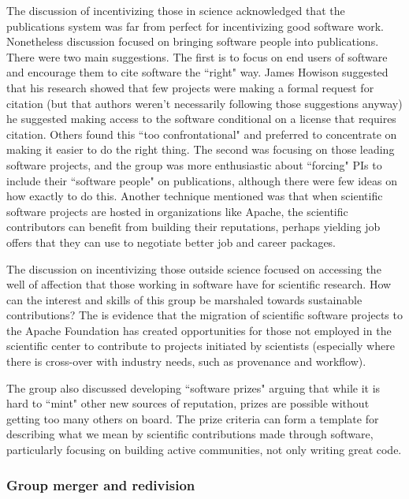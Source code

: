 \documentclass[11pt, oneside]{amsart}
\begin{document}
The discussion of incentivizing those in science acknowledged that the publications system was far from perfect for incentivizing good software work.
Nonetheless discussion focused on bringing software people into publications. There were two main suggestions.
The first is to focus on end users of software and encourage them to cite software the ``right" way.
James Howison suggested that his research showed that few projects were making a formal request for citation (but that authors weren't necessarily following those suggestions anyway) \cite{howison2015jasist} he suggested making access to the software conditional on a license that requires citation.
Others found this ``too confrontational" and preferred to concentrate on making it easier to do the right thing.
The second was focusing on those leading software projects, and the group was more enthusiastic about ``forcing" PIs to include their ``software people" on publications, although there were few ideas on how exactly to do this.
Another technique mentioned was that when scientific software projects are hosted in organizations like Apache, the scientific contributors can benefit from building their reputations, perhaps yielding job offers that they can use to negotiate better job and career packages.

The discussion on incentivizing those outside science focused on accessing the well of affection that those working in software have for scientific research.
How can the interest and skills of this group be marshaled towards sustainable contributions?
The is evidence that the migration of scientific software projects to the Apache Foundation has created opportunities for those not employed in the scientific center to contribute to projects initiated by scientists (especially where there is cross-over with industry needs, such as provenance and workflow).

The group also discussed developing ``software prizes" arguing that while it is hard to ``mint" other new sources of reputation, prizes are possible without getting too many others on board.
The prize criteria can form a template for describing what we mean by scientific contributions made through software, particularly focusing on building active communities, not only writing great code. 

\subsubsection{Group merger and redivision}
\end{document}
